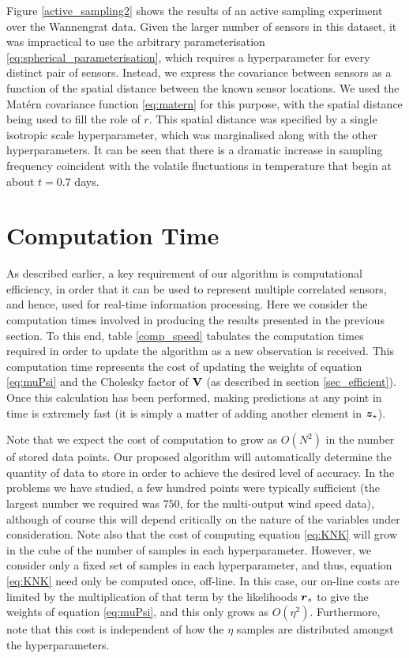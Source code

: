 \documentclass{acmtrans2m}
\begin{document}
Figure \ref{active_sampling2} shows the results of an active sampling experiment over the Wannengrat data. Given the larger number of sensors in this dataset, it was impractical to use the arbitrary parameterisation  \eqref{eq:spherical_parameterisation}, which requires a hyperparameter for every distinct pair of sensors. Instead, we express the covariance between sensors as a function of the spatial distance between the known sensor locations. We used the Mat\'{e}rn covariance function \eqref{eq:matern} for this purpose, with the spatial distance being used to fill the role of $r$. This spatial distance was specified by a single isotropic scale hyperparameter, which was marginalised along with the other hyperparameters. It can be seen that there is a dramatic increase in sampling frequency coincident with the volatile fluctuations in temperature that begin at about $t=0.7$ days.


\section{Computation Time}\label{sec_computation}

\noindent As described earlier, a key requirement of our algorithm is computational efficiency, in order that it can be used to represent multiple correlated sensors, and hence, used for real-time information processing. Here we consider the computation times involved in producing the results presented in the previous section. To this end, table \ref{comp_speed} tabulates the computation times required in order to update the algorithm as a new observation is received. This computation time represents the cost of updating the weights of equation \eqref{eq:muPsi} and the Cholesky factor of $\mathbf{V}$ (as described in section \ref{sec_efficient}). Once this calculation has been performed, making predictions at any point in time is extremely fast (it is simply a matter of adding another element in $\boldsymbol{z}_\star$).

Note that we expect the cost of computation to grow as $O(N^2)$ in the number of stored data points. Our proposed algorithm will automatically determine the quantity of data to store in order to achieve the desired level of accuracy. In the problems we have studied, a few hundred points were typically sufficient (the largest number we required was $750$, for the multi-output wind speed data), although of course this will depend critically on the nature of the variables under consideration. Note also that the cost of computing equation \eqref{eq:KNK} will grow in the cube of the number of samples in each hyperparameter. However, we consider only a fixed set of samples in each hyperparameter, and thus, equation \eqref{eq:KNK} need only be computed once, off-line. In this case, our on-line costs are limited by the multiplication of that term by the likelihoods $\boldsymbol{r}_s$ to give the weights of equation \eqref{eq:muPsi}, and this only grows as $O(\eta^2)$. Furthermore, note that this cost is independent of how the $\eta$ samples are distributed amongst the hyperparameters.
\end{document}
